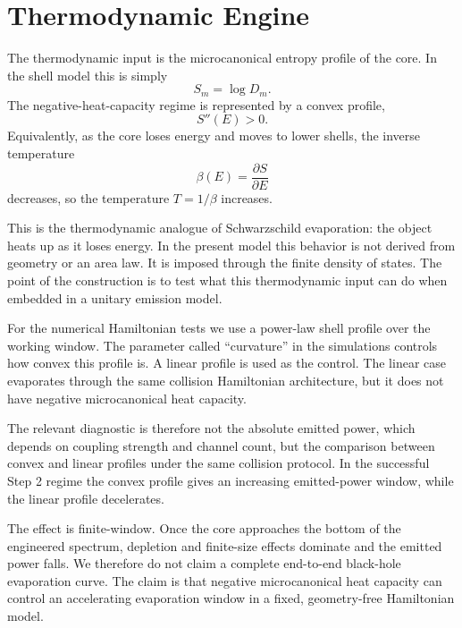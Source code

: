 \section{Thermodynamic Engine}

The thermodynamic input is the microcanonical entropy profile of the core. In the shell model this is simply
\begin{equation}
  S_m=\log D_m.
\end{equation}
The negative-heat-capacity regime is represented by a convex profile,
\begin{equation}
  S''(E)>0.
\end{equation}
Equivalently, as the core loses energy and moves to lower shells, the inverse temperature
\begin{equation}
  \beta(E)=\frac{\partial S}{\partial E}
\end{equation}
decreases, so the temperature $T=1/\beta$ increases.

This is the thermodynamic analogue of Schwarzschild evaporation: the object heats up as it loses energy. In the present model this behavior is not derived from geometry or an area law. It is imposed through the finite density of states. The point of the construction is to test what this thermodynamic input can do when embedded in a unitary emission model.

For the numerical Hamiltonian tests we use a power-law shell profile over the working window. The parameter called ``curvature'' in the simulations controls how convex this profile is. A linear profile is used as the control. The linear case evaporates through the same collision Hamiltonian architecture, but it does not have negative microcanonical heat capacity.

The relevant diagnostic is therefore not the absolute emitted power, which depends on coupling strength and channel count, but the comparison between convex and linear profiles under the same collision protocol. In the successful Step 2 regime the convex profile gives an increasing emitted-power window, while the linear profile decelerates.

The effect is finite-window. Once the core approaches the bottom of the engineered spectrum, depletion and finite-size effects dominate and the emitted power falls. We therefore do not claim a complete end-to-end black-hole evaporation curve. The claim is that negative microcanonical heat capacity can control an accelerating evaporation window in a fixed, geometry-free Hamiltonian model.
